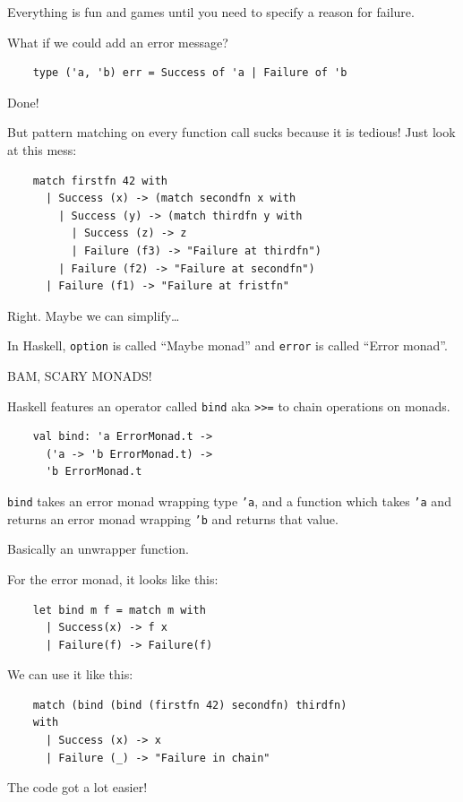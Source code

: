 \documentclass{beamer}
\renewcommand{\example}[1]{{\usebeamercolor[fg]{example text} #1}}
\begin{document}
\begin{frame}[fragile]
  Everything is fun and games until you need to specify a \alert{reason} for
  failure.

  What if we could add an error message?
  \begin{verbatim}
    type ('a, 'b) err = Success of 'a | Failure of 'b
  \end{verbatim}
  Done!
\end{frame}

\begin{frame}[fragile]
  But pattern matching on every function call sucks because it is
  \alert{tedious}! Just look at this mess:
  \begin{verbatim}
    match firstfn 42 with
      | Success (x) -> (match secondfn x with
        | Success (y) -> (match thirdfn y with
          | Success (z) -> z
          | Failure (f3) -> "Failure at thirdfn")
        | Failure (f2) -> "Failure at secondfn")
      | Failure (f1) -> "Failure at fristfn"
  \end{verbatim}

  Right. Maybe we can \example{simplify}…

  In Haskell, \texttt{option} is called \enquote{Maybe monad} and
  \texttt{error} is called \enquote{Error monad}.

  \pause
  \begin{center}
    {\Large \alert{BAM, SCARY MONADS!}}
  \end{center}
\end{frame}

\begin{frame}[fragile]
  Haskell features an operator called \texttt{bind} aka \texttt{>>=} to
  chain operations on monads.

  \begin{verbatim}
    val bind: 'a ErrorMonad.t ->
      ('a -> 'b ErrorMonad.t) ->
      'b ErrorMonad.t
  \end{verbatim}

  \texttt{bind} takes an error monad wrapping type \texttt{'a}, and a function
  which takes \texttt{'a} and returns an error monad wrapping
  \texttt{'b} and returns that value.

  Basically an unwrapper function.
\end{frame}

\begin{frame}[fragile]
  For the error monad, it looks like this:
  \begin{verbatim}
    let bind m f = match m with
      | Success(x) -> f x
      | Failure(f) -> Failure(f)
  \end{verbatim}

  We can use it like this:

  \begin{verbatim}
    match (bind (bind (firstfn 42) secondfn) thirdfn)
    with
      | Success (x) -> x
      | Failure (_) -> "Failure in chain"
  \end{verbatim}
  The code got a lot \example{easier}!
\end{frame}
\end{document}
